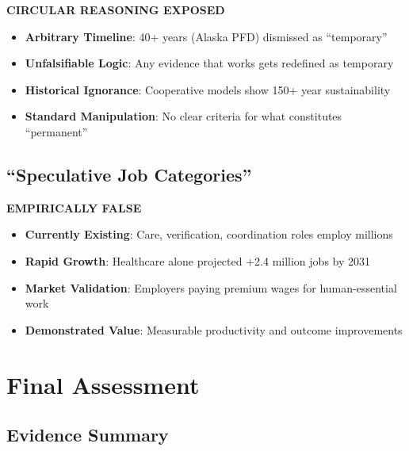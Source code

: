 \documentclass[11pt,a4paper]{article}
\newcommand{\verdict}[1]{\textcolor{primaryblue}{\textbf{#1}}}
\begin{document}
\verdict{CIRCULAR REASONING EXPOSED}

\begin{itemize}[leftmargin=*]
\item \textbf{Arbitrary Timeline}: 40+ years (Alaska PFD) dismissed as ``temporary''
\item \textbf{Unfalsifiable Logic}: Any evidence that works gets redefined as temporary
\item \textbf{Historical Ignorance}: Cooperative models show 150+ year sustainability
\item \textbf{Standard Manipulation}: No clear criteria for what constitutes ``permanent''
\end{itemize}

\subsection{``Speculative Job Categories''}

\verdict{EMPIRICALLY FALSE}

\begin{itemize}[leftmargin=*]
\item \textbf{Currently Existing}: Care, verification, coordination roles employ millions
\item \textbf{Rapid Growth}: Healthcare alone projected +2.4 million jobs by 2031
\item \textbf{Market Validation}: Employers paying premium wages for human-essential work
\item \textbf{Demonstrated Value}: Measurable productivity and outcome improvements
\end{itemize}

\section{Final Assessment}

\begin{center}
\end{center}

\subsection{Evidence Summary}
\end{document}

